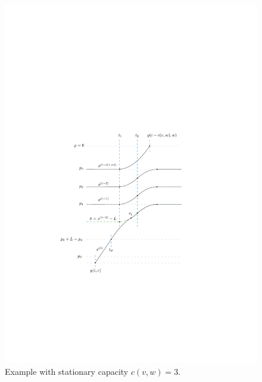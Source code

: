 \documentclass[a4paper]{article}
\theoremstyle{definition}
\theoremstyle{plain}
\begin{document}
\begin{figure}
  \centering
  \includegraphics[scale=1]{figures/motion/example1}
  \caption{Example with stationary capacity $c(v,w) = 3$.}
\end{figure}
\end{document}
